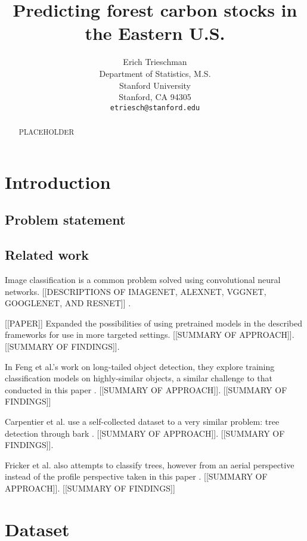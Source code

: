 \documentclass{article}
\title{Predicting forest carbon stocks in the Eastern U.S.}
\author{%
  Erich Trieschman\\
  Department of Statistics, M.S.\\
  Stanford University\\
  Stanford, CA 94305\\
  \texttt{etriesch@stanford.edu} \\
}
\begin{document}
\maketitle

\begin{abstract}
  PLACEHOLDER
\end{abstract}

\section{Introduction}


\subsection{Problem statement}


\subsection{Related work}

Image classification is a common problem solved using convolutional neural networks. [[DESCRIPTIONS OF IMAGENET, ALEXNET, VGGNET, GOOGLENET, AND RESNET]] \cite{VGGNet, GoogLeNET, ResNET}. 

[[PAPER]] Expanded the possibilities of using pretrained models in the described frameworks for use in more targeted settings. [[SUMMARY OF APPROACH]]. [[SUMMARY OF FINDINGS]].

In Feng et al.'s work on long-tailed object detection, they explore training classification models on highly-similar objects, a similar challenge to that conducted in this paper \cite{Feng_2021_ICCV}.  [[SUMMARY OF APPROACH]]. [[SUMMARY OF FINDINGS]]

Carpentier et al. use a self-collected dataset to a very similar problem: tree detection through bark \cite{Carpentier_2018}. [[SUMMARY OF APPROACH]]. [[SUMMARY OF FINDINGS]].

Fricker et al. also attempts to classify trees, however from an aerial perspective instead of the profile perspective taken in this paper \cite{Fricker_RS_2019}. [[SUMMARY OF APPROACH]]. [[SUMMARY OF FINDINGS]]

\section{Dataset}
\end{document}
